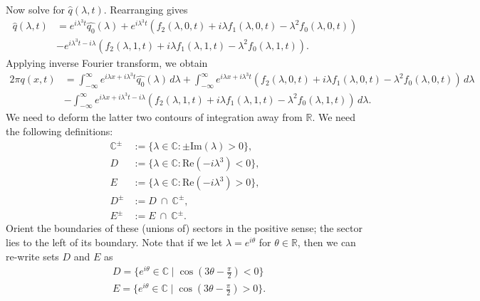 Now solve for $\hat{q}(\lambda, t)$. Rearranging gives 
\begin{equation*}
\begin{aligned}
\hat{q}(\lambda, t) &= e^{i \lambda^3 t}\hat{q_0}(\lambda) + e^{i \lambda^3 t}\left(f_2(\lambda, 0, t) + i \lambda f_1(\lambda, 0, t) - \lambda^2 f_0(\lambda, 0, t)\right) \\
&- e^{i \lambda^3 t-i \lambda} \left(f_2(\lambda, 1, t) + i \lambda f_1(\lambda, 1, t) - \lambda^2 f_0(\lambda, 1, t)\right).
\end{aligned}
\end{equation*}
Applying inverse Fourier transform, we obtain
\begin{equation*}
\begin{aligned}
2\pi q(x, t) &= \int_{-\infty}^\infty e^{i\lambda x + i \lambda^3 t}\hat{q_0}(\lambda)\,d\lambda + \int_{-\infty}^\infty e^{i\lambda x + i \lambda^3 t}\left(f_2(\lambda, 0, t) + i \lambda f_1(\lambda, 0, t) - \lambda^2 f_0(\lambda, 0, t)\right)\,d\lambda \\
&- \int_{-\infty}^\infty e^{i\lambda x+i \lambda^3 t-i\lambda} \left(f_2(\lambda, 1, t) + i \lambda f_1(\lambda, 1, t) - \lambda^2 f_0(\lambda, 1, t)\right)\,d\lambda.
\end{aligned}
\end{equation*}
We need to deform the latter two contours of integration away from $\mathbb{R}$. We need the following definitions:
\begin{align*}
    \mathbb{C}^\pm &:= \{\lambda \in \mathbb{C}: \pm \mathrm{Im}(\lambda)>0\},\\
    D &:= \{\lambda \in \mathbb{C}: \mathrm{Re}(-i\lambda^3) < 0\}, \\
    E &:= \{\lambda \in \mathbb{C}: \mathrm{Re}(-i\lambda^3) > 0\},\\
    D^\pm & := D~\cap~\mathbb{C}^\pm,\\
    E^\pm & := E~\cap~\mathbb{C}^\pm.
\end{align*}
Orient the boundaries of these (unions of) sectors in the positive sense; the sector lies to the left of its boundary.
Note that if we let $\lambda = e^{i\theta}$ for $\theta \in \mathbb{R}$, then we can re-write sets $D$ and $E$ as
\begin{align*}
    &D = \{ e^{i\theta} \in \mathbb{C} \mid \cos(3\theta - \frac{\pi}{2}) < 0 \} \\
    &E = \{ e^{i\theta} \in \mathbb{C} \mid \cos(3\theta - \frac{\pi}{2}) > 0 \}. \\
\end{align*}
